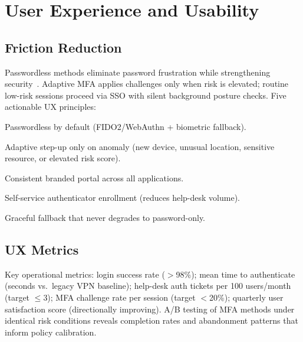 \documentclass[sigconf,nonacm]{acmart}
\begin{document}
\section{User Experience and Usability}

\subsection{Friction Reduction}

Passwordless methods eliminate password frustration while strengthening
security~\cite{ping2024pass}.  Adaptive MFA applies challenges only when
risk is elevated; routine low-risk sessions proceed via SSO with silent
background posture checks.  Five actionable UX principles:

\begin{description}[leftmargin=1.4em, labelindent=0pt,
                    topsep=2pt, itemsep=1pt, labelsep=0.5em]
  \item[UX1.] Passwordless by default (FIDO2/WebAuthn + biometric fallback).
  \item[UX2.] Adaptive step-up only on anomaly (new device, unusual location,
              sensitive resource, or elevated risk score).
  \item[UX3.] Consistent branded portal across all applications.
  \item[UX4.] Self-service authenticator enrollment (reduces help-desk volume).
  \item[UX5.] Graceful fallback that never degrades to password-only.
\end{description}

\subsection{UX Metrics}

Key operational metrics: login success rate ($>$98\%); mean time to
authenticate (seconds vs.\ legacy VPN baseline); help-desk auth
tickets per 100 users/month (target $\leq$3); MFA challenge rate per
session (target ${<}$20\%); quarterly user satisfaction score
(directionally improving).  A/B testing of MFA methods under identical
risk conditions reveals completion rates and abandonment patterns that
inform policy calibration.

\end{document}
